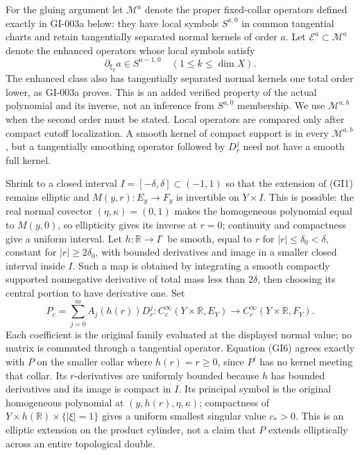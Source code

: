 \documentclass[
  11pt,
]{article}
\begin{document}
For the gluing argument let \(\mathscr M^a\) denote the proper
fixed-collar operators defined exactly in GI-003a below: they have local
symbols \(S^{a,0}\) in common tangential charts and retain tangentially
separated normal kernels of order \(a\). Let
\(\mathscr E^a\subset\mathscr M^a\) denote the enhanced operators whose
local symbols satisfy \[
 \partial_{\xi_k}a\in S^{a-1,0}\quad(1\leq k\leq\dim X).
 \tag{GI5}
\] The enhanced class also has tangentially separated normal kernels one
total order lower, as GI-003a proves. This is an added verified property
of the actual polynomial and its inverse, not an inference from
\(S^{a,0}\) membership. We use \(\mathscr M^{a,b}\) when the second
order must be stated. Local operators are compared only after compact
cutoff localization. A smooth kernel of compact support is in every
\(\mathscr M^{a,b}\), but a tangentially smoothing operator followed by
\(D_r^j\) need not have a smooth full kernel.

Shrink to a closed interval \(I=[-\delta,\delta]\subset(-1,1)\) so that
the extension of (GI1) remains elliptic and \(M(y,r):E_y\to F_y\) is
invertible on \(Y\times I\). This is possible: the real normal covector
\((\eta,\kappa)=(0,1)\) makes the homogeneous polynomial equal to
\(M(y,0)\), so ellipticity gives its inverse at \(r=0\); continuity and
compactness give a uniform interval. Let \(h:\mathbb R\to I^\circ\) be
smooth, equal to \(r\) for \(|r|\leq\delta_0<\delta\), constant for
\(|r|\geq2\delta_0\), with bounded derivatives and image in a smaller
closed interval inside \(I\). Such a map is obtained by integrating a
smooth compactly supported nonnegative derivative of total mass less
than \(2\delta\), then choosing its central portion to have derivative
one. Set \[
 P_c=\sum_{j=0}^{m}A_j(h(r))D_r^j
 :C_c^\infty(Y\times\mathbb R,E_Y)\longrightarrow
 C_c^\infty(Y\times\mathbb R,F_Y).
 \tag{GI6}
\] Each coefficient is the original family evaluated at the displayed
normal value; no matrix is commuted through a tangential operator.
Equation (GI6) agrees exactly with \(P\) on the smaller collar where
\(h(r)=r\geq0\), since \(P^i\) has no kernel meeting that collar. Its
\(r\)-derivatives are uniformly bounded because \(h\) has bounded
derivatives and its image is compact in \(I\). Its principal symbol is
the original homogeneous polynomial at \((y,h(r),\eta,\kappa)\);
compactness of \(Y\times h(\mathbb R)\times\{|\xi|=1\}\) gives a uniform
smallest singular value \(c_*>0\). This is an elliptic extension on the
product cylinder, not a claim that \(P\) extends elliptically across an
entire topological double.
\end{document}
